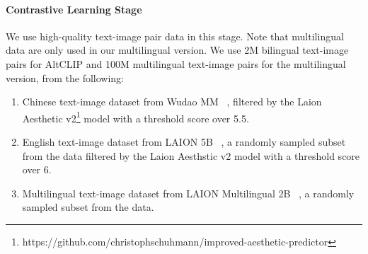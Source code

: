 \paragraph{Contrastive Learning Stage}
We use high-quality text-image pair data in this stage. Note that multilingual data are only used in our multilingual version.
We use 2M bilingual text-image pairs for AltCLIP and 100M multilingual text-image pairs for the multilingual version, from the following:
\begin{enumerate}
\item Chinese text-image dataset from Wudao MM ~\cite{yuan2021wudaocorpora}, filtered by the Laion Aesthetic v2\footnote{https://github.com/christophschuhmann/improved-aesthetic-predictor} model with a threshold score over 5.5.
\item English text-image dataset from LAION 5B ~\cite{schuhmann2022laion}, a randomly sampled subset from the data filtered by the Laion Aesthstic v2 model with a threshold score over 6.

\item Multilingual text-image dataset from LAION Multilingual 2B ~\cite{schuhmann2022laion}, a randomly sampled subset from the data.
\end{enumerate}

